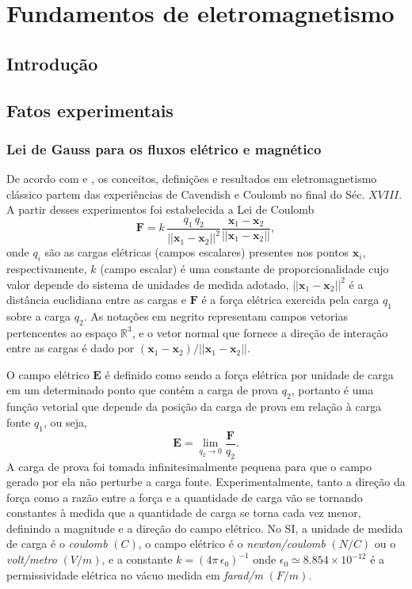 \chapter{Fundamentos de eletromagnetismo}\label{sec.fund_eletr}

\section{Introdução}

\section{Fatos experimentais}

\subsection{Lei de Gauss para os fluxos elétrico e magnético}
De acordo com \cite{jackson_classical_1999} e \cite{sommerfeld_52} , os conceitos, definições e resultados em eletromagnetismo clássico partem das experiências de Cavendish e Coulomb no final do Séc. $XVIII$. A partir desses experimentos foi estabelecida a Lei de Coulomb
\begin{equation}\label{eq.forc_elet}
\textbf{F}=k\,\frac{q_1\,q_2}{||\textbf{x}_1-\textbf{x}_2||^2}\frac{\textbf{x}_1-\textbf{x}_2}{||\textbf{x}_1-\textbf{x}_2||},
\end{equation}
onde $q_i$ são as cargas elétricas (campos escalares) presentes nos pontos $\textbf{x}_i$, respectivamente, $k$ (campo escalar) é uma constante de proporcionalidade cujo valor depende do sistema de unidades de medida adotado, $||\textbf{x}_1-\textbf{x}_2||^2$ é a distância euclidiana entre as cargas e $\textbf{F}$ é a força elétrica exercida pela carga $q_1$ sobre a carga $q_2$. As notações em negrito representam campos vetorias pertencentes ao espaço $\mathbb{R}^3$, e o vetor normal que fornece a direção de interação entre as cargas é dado por $(\textbf{x}_1-\textbf{x}_2)/||\textbf{x}_1-\textbf{x}_2||$.

O campo elétrico $\textbf{E}$ é definido como sendo a força elétrica por unidade de carga em um determinado ponto que contém a carga de prova $q_2$, portanto é uma função vetorial que depende da posição da carga de prova em relação à carga fonte $q_1$, ou seja,
\begin{equation}\label{eq.camp_elet}
\textbf{E}=\lim_{q_2\to 0}\frac{\textbf{F}}{q_2}.
\end{equation}
A carga de prova foi tomada infinitesimalmente pequena para que o campo gerado por ela não perturbe a carga fonte. Experimentalmente, tanto a direção da força como a razão entre a força e a quantidade de carga vão se tornando constantes à medida que a quantidade de carga se torna cada vez menor, definindo a magnitude e a direção do campo elétrico. No SI, a unidade de medida de carga é o \textit{coulomb} $(C)$, o campo elétrico é o \textit{newton/coulomb} $(N/C)$ ou o \textit{volt/metro} $(V/m)$, e a constante $k=(4\pi\,\epsilon_0)^{-1}$ onde $\epsilon_0\simeq8.854\times10^{-12}$ é a permissividade elétrica no vácuo medida em \textit{farad/m} $(F/m)$.

